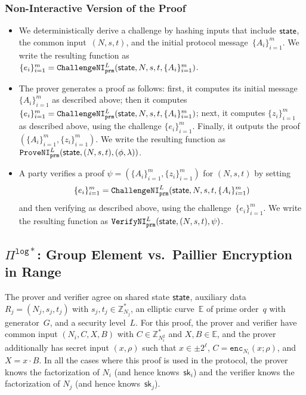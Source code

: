 \documentclass[11pt]{article}
\def\state{{\sf state}}
\newcommand{\enc}{\ensuremath{\mathtt{enc}}}
\newcommand{\proof}[1]{\ensuremath{\Pi^{\mathtt{#1}}}}
\newcommand{\challengeni}[1]{\ensuremath{\mathtt{ChallengeNI}_{\mathtt{#1}}}}
\newcommand{\proveni}[1]{\ensuremath{\mathtt{ProveNI}_{\mathtt{#1}}}}
\newcommand{\verifyni}[1]{\ensuremath{\mathtt{VerifyNI}_{\mathtt{#1}}}}
\newcommand{\sk}{\textsf{sk}}
\newcommand{\E}{\mathbb{E}}
\newcommand{\?}[1]{\stackrel{?}{#1}}
\begin{document}
\subsubsection{Non-Interactive Version of the Proof}
\begin{itemize}
  \item We deterministically derive a challenge by hashing inputs that include $\state$, the common input~$(N,s,t)$, and the initial protocol message~$\{A_i\}_{i=1}^m$.   
  We write the resulting function as
  $\{e_i\}_{i=1}^m = \challengeni{prm}^L(\state, N, s, t, \{A_i\}_{i=1}^m)$.

  \item The prover generates a proof as follows: first, it computes its initial message $\{A_i\}_{i=1}^m$ as described above; then it computes $\{e_i\}_{i=1}^m = \challengeni{prm}^L(\state, N, s, t, \{A_i\}_{i=1}^m)$; next, it computes $\{z_i\}_{i=1}^m$ as described above, using the challenge $\{e_i\}_{i=1}^m$. Finally, it outputs the proof $(\{A_i\}_{i=1}^m, \{z_i\}_{i=1}^m)$. We write the resulting function as $\proveni{prm}^L(\state, (N, s, t), (\phi, \lambda))$.
  
  \item A party verifies a proof $\psi=(\{A_i\}_{i=1}^m, \{z_i\}_{i=1}^m)$ for $(N, s, t)$ by  setting \[\{e_i\}_{i=1}^m = \challengeni{prm}^L(\state, N, s, t, \{A_i\}_{i=1}^m)\] and then verifying as described above, using the challenge~$\{e_i\}_{i=1}^m$. We write the resulting function as $\verifyni{prm}^L(\state, (N, s, t), \psi)$.
  \end{itemize}

\subsection{$\proof{log*}$: Group Element vs.\ Paillier Encryption in Range}
The prover and verifier agree on shared state $\state$, auxiliary data $R_j=(N_j, s_j, t_j)$ with $s_j, t_j \in {\mathbb Z}^*_{N_j}$, 
an elliptic curve~$\E$ of prime order~$q$ with generator~$G$,
and a security level~$L$. For this proof, the prover and verifier have common input $(N_i, C, X, B)$ with $C \in {\mathbb Z}^*_{N_i^2}$ and $X, B \in \E$, and the prover additionally has secret input $(x, \rho)$ such that $x \in \pm 2^\ell$, $C=\enc_{N_i}(x; \rho)$, and $X = x \cdot B$.
In all the cases where this proof is used in the protocol, the prover knows the factorization of $N_i$ (and hence knows~$\sk_i$) and the verifier knows the factorization of $N_j$ (and hence knows~$\sk_j$).
\end{document}
